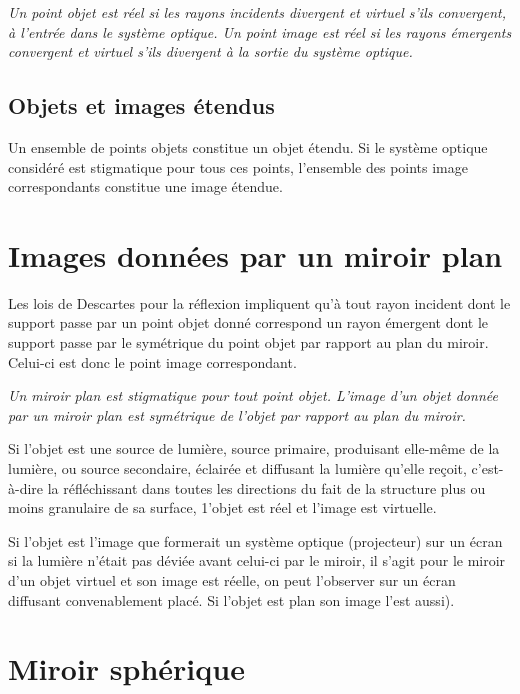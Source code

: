 \emph{Un point objet est réel si les rayons incidents divergent et virtuel s'ils convergent, à l'entrée dans le système optique. Un point image est réel si les rayons émergents convergent et virtuel s'ils divergent à la sortie du système optique.}

\subsection{Objets et images étendus}
\label{chap7-subsec:objetsimagesetendues}

Un ensemble de points objets constitue un objet étendu. Si le système optique considéré est stigmatique pour tous ces points, l'ensemble des points image correspondants constitue une image étendue.


\section{Images données par un miroir plan}
\label{chap7-sec:imagemiroirplan}

Les lois de Descartes pour la réflexion impliquent qu'à tout rayon incident dont le support passe par un point objet donné correspond un rayon émergent dont le support passe par le symétrique du point objet par rapport au plan du miroir. Celui-ci est donc le point image correspondant.

\emph{Un miroir plan est stigmatique pour tout point objet. L'image d'un objet donnée par un miroir plan est symétrique de l'objet par rapport au plan du miroir.}

Si l'objet est une source de lumière, source primaire, produisant elle-même de la lumière, ou source secondaire, éclairée et diffusant la lumière qu'elle reçoit, c'est-à-dire la réfléchissant dans toutes les directions du fait de la structure plus ou moins granulaire de sa surface, 1'objet est réel et l'image est virtuelle.

Si l'objet est l'image que formerait un système optique (projecteur) sur un écran si la lumière n'était pas déviée avant celui-ci par le miroir, il s'agit pour le miroir d'un objet virtuel et son image est réelle, on peut l'observer sur un écran diffusant convenablement placé. Si l'objet est plan son image l'est aussi).

\section{Miroir sphérique}
\label{chap7-sec:miroirspherique}


